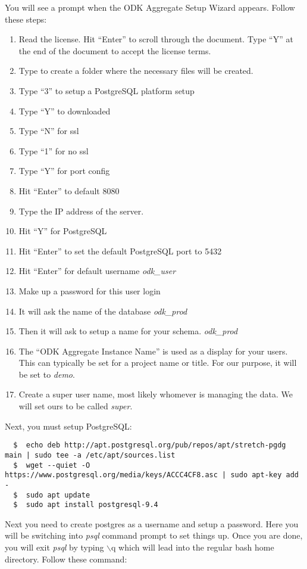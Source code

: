\noindent
You will see a prompt when the ODK Aggregate Setup Wizard appears. Follow these steps:

\begin{enumerate}
\item Read the license. Hit ``Enter'' to scroll through the document. Type ``Y'' at the end of the document to accept the license terms.
\item Type  to create a folder where the necessary files will be created.
\item  Type ``3'' to setup a PostgreSQL platform setup
\item Type ``Y'' to downloaded
\item Type ``N'' for ssl
\item Type ``1'' for no ssl
\item Type ``Y'' for port config
\item Hit ``Enter'' to default 8080
\item Type the IP address of the server.
\item Hit ``Y'' for PostgreSQL
\item Hit ``Enter'' to set the default PostgreSQL port to 5432
\item Hit ``Enter'' for default username \emph{odk\_user}
\item Make up a password for this user login
\item It will ask the name of the database \emph{odk\_prod}
\item Then it will ask to setup a name for your schema. \emph{odk\_prod}
\item The ``ODK Aggregate Instance Name'' is used as a display for your users. This can typically be set for a project name or title. For our purpose, it will be set to
\emph{demo}.
\item Create a super user name, most likely whomever is managing the data. We will set ours to be called \emph{super}.
\end{enumerate}

\noindent
Next, you must setup PostgreSQL:
\begin{lstlisting}
  $  echo deb http://apt.postgresql.org/pub/repos/apt/stretch-pgdg main | sudo tee -a /etc/apt/sources.list
  $  wget --quiet -O https://www.postgresql.org/media/keys/ACCC4CF8.asc | sudo apt-key add -
  $  sudo apt update
  $  sudo apt install postgresql-9.4
\end{lstlisting}

Next you need to create postgres as a username and setup a password. Here you will be switching into \emph{psql} command prompt to set things up. Once you are done, you will exit \emph{psql} by typing $\backslash$q which will lead into the regular bash home directory. Follow these command:

